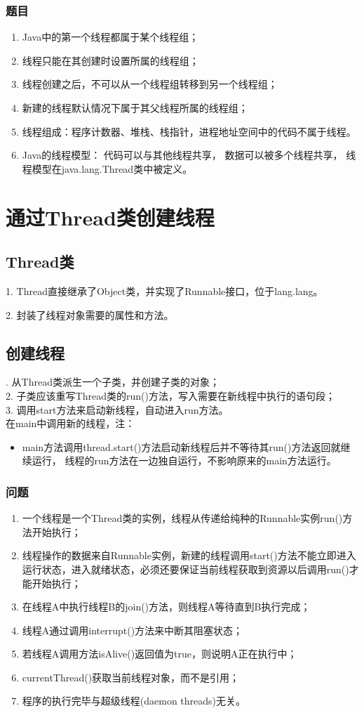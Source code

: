 \subsubsection{题目}
\begin{enumerate}
	\item Java中的第一个线程都属于某个线程组；
	\item 线程只能在其创建时设置所属的线程组；
	\item 线程创建之后，不可以从一个线程组转移到另一个线程组；
	\item 新建的线程默认情况下属于其父线程所属的线程组；
	\item 线程组成：程序计数器、堆栈、栈指针，进程地址空间中的代码不属于线程。
	\item Java的线程模型：
	代码可以与其他线程共享，
	数据可以被多个线程共享，
	线程模型在java.lang.Thread类中被定义。
\end{enumerate}
\section{通过Thread类创建线程}
\subsection{Thread类}
1. Thread直接继承了Object类，并实现了Runnable接口，位于lang.lang。
\par 2. 封装了线程对象需要的属性和方法。
\subsection{创建线程}
. 从Thread类派生一个子类，并创建子类的对象；
\\2. 子类应该重写Thread类的run()方法，写入需要在新线程中执行的语句段；
\\3. 调用start方法来启动新线程，自动进入run方法。
\\在main中调用新的线程，注：
\begin{itemize}
	\item main方法调用thread.start()方法启动新线程后并不等待其run()方法返回就继续运行，
	线程的run方法在一边独自运行，不影响原来的main方法运行。
\end{itemize}
\subsubsection{问题}
\begin{enumerate}
	\item 一个线程是一个Thread类的实例，线程从传递给纯种的Runnable实例run()方法开始执行；
	\item 线程操作的数据来自Runnable实例，新建的线程调用start()方法不能立即进入运行状态，进入就绪状态，必须还要保证当前线程获取到资源以后调用run()才能开始执行；
	\item 在线程A中执行线程B的join()方法，则线程A等待直到B执行完成；
	\item 线程A通过调用interrupt()方法来中断其阻塞状态；
	\item 若线程A调用方法isAlive()返回值为true，则说明A正在执行中；
	\item currentThread()获取当前线程对象，而不是引用；
	\item 程序的执行完毕与超级线程(daemon threads)无关。
\end{enumerate}
